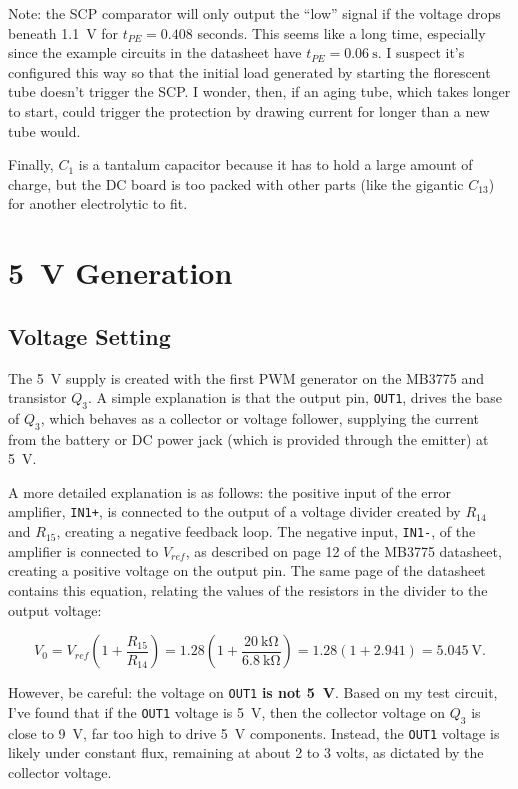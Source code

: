 \documentclass{article}
\newcommand{\Vref}{$V_{ref}$}
\newcommand{\chippin}{\texttt}
\begin{document}
Note: the SCP comparator will only output the ``low'' signal if the
voltage drops beneath \qty{1.1}{\volt} for $t_{PE} = 0.408$
seconds. This seems like a long time, especially since the example
circuits in the datasheet have $t_{PE} = \qty{0.06}{\second}$. I
suspect it's configured this way so that the initial load generated by
starting the florescent tube doesn't trigger the SCP. I wonder, then,
if an aging tube, which takes longer to start, could trigger the
protection by drawing current for longer than a new tube would.

Finally, $C_1$ is a tantalum capacitor because it has to hold a large
amount of charge, but the DC board is too packed with other parts
(like the gigantic $C_{13}$) for another electrolytic to fit.

\section{\qty{5}{\volt} Generation}
\subsection{Voltage Setting}
The \qty{5}{\volt} supply is created with the first PWM generator on
the MB3775 and transistor $Q_3$. A simple explanation is that the
output pin, \chippin{OUT1}, drives the base of $Q_3$, which behaves as
a collector or voltage follower, supplying the current from the
battery or DC power jack (which is provided through the emitter) at
\qty{5}{\volt}.

A more detailed explanation is as follows: the positive input of the
error amplifier, \chippin{IN1+}, is connected to the output of a
voltage divider created by $R_{14}$ and $R_{15}$, creating a negative
feedback loop. The negative input, \chippin{IN1-}, of the amplifier is
connected to \Vref, as described on page 12 of the MB3775 datasheet,
creating a positive voltage on the output pin. The same page of the
datasheet contains this equation, relating the values of the resistors
in the divider to the output voltage:

\begin{displaymath}
  V_0 = V_{ref}(1+\frac{R_{15}}{R_{14}}) =
  1.28(1+\frac{\qty{20}{\kilo\ohm}}{\qty{6.8}{\kilo\ohm}})
  = 1.28(1+2.941) = \qty{5.045}{\volt}.
\end{displaymath}

However, be careful: the voltage on \chippin{OUT1} \textbf{is not
  \qty{5}{\volt}}. Based on my test circuit, I've found that if the
\chippin{OUT1} voltage is \qty{5}{\volt}, then the collector voltage
on $Q_3$ is close to \qty{9}{\volt}, far too high to drive
\qty{5}{\volt} components. Instead, the \chippin{OUT1} voltage is
likely under constant flux, remaining at about 2 to 3 volts, as
dictated by the collector voltage.
\end{document}

